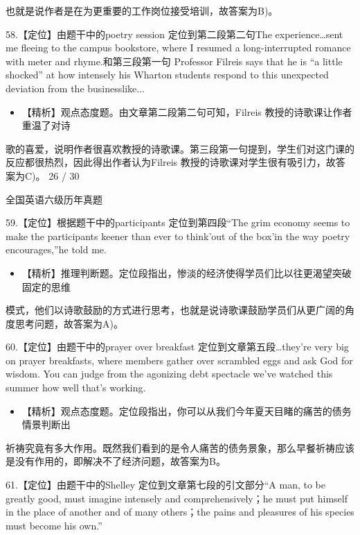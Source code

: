 \documentclass[UTF8,11pt]{ctexart}
\begin{document}
也就是说作者是在为更重要的工作岗位接受培训，故答案为B)。


58.【定位】由题干中的poetry session 定位到第二段第二句The experience…sent me fleeing to the campus bookstore, where I resumed a long-interrupted romance with meter and rhyme.和第三段第一句 Professor Filreis says that he is “a little shocked” at how intensely his Wharton students respond to this unexpected deviation from the businesslike...


\begin{itemize}[leftmargin=2em,itemsep=.2em,topsep=.4em]\item[C.] 【精析】观点态度题。由文章第二段第二句可知，Filreis 教授的诗歌课让作者重温了对诗
\end{itemize}

歌的喜爱，说明作者很喜欢教授的诗歌课。第三段第一句提到，学生们对这门课的反应都很热烈，因此得出作者认为Filreis 教授的诗歌课对学生很有吸引力，故答案为C)。 26 / 30


全国英语六级历年真题


59.【定位】根据题干中的participants 定位到第四段“The grim economy seems to make the participants keener than ever to think'out of the box'in the way poetry encourages,”he told me.


\begin{itemize}[leftmargin=2em,itemsep=.2em,topsep=.4em]\item[A.] 【精析】推理判断题。定位段指出，惨淡的经济使得学员们比以往更渴望突破固定的思维
\end{itemize}

模式，他们以诗歌鼓励的方式进行思考，也就是说诗歌课鼓励学员们从更广阔的角度思考问题，故答案为A)。


60.【定位】由题干中的prayer over breakfast 定位到文章第五段…they're very big on prayer breakfasts, where members gather over scrambled eggs and ask God for wisdom. You can judge from the agonizing debt spectacle we've watched this summer how well that's working.


\begin{itemize}[leftmargin=2em,itemsep=.2em,topsep=.4em]\item[B.] 【精析】观点态度题。定位段指出，你可以从我们今年夏天目睹的痛苦的债务情景判断出
\end{itemize}

祈祷究竟有多大作用。既然我们看到的是令人痛苦的债务景象，那么早餐祈祷应该是没有作用的，即解决不了经济问题，故答案为B。


61.【定位】由题干中的Shelley 定位到文章第七段的引文部分“A man, to be greatly good, must imagine intensely and comprehensively；he must put himself in the place of another and of many others；the pains and pleasures of his species must become his own.”
\end{document}
